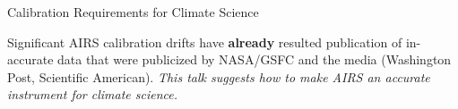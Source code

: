 \documentclass[10pt,t]{beamer}
\begin{document}
\begin{frame}[label={sec:orge0f03c3},shrink=30]{Calibration Requirements for Climate Science}
\vspace{0.2in}
\begin{large}
Significant AIRS calibration drifts have \textbf{already} resulted publication of in-accurate data that were publicized by NASA/GSFC and the media (Washington Post, Scientific American).  \emph{This talk suggests how to make AIRS an accurate instrument for climate science.}
\end{large}
\end{frame}
\end{document}
